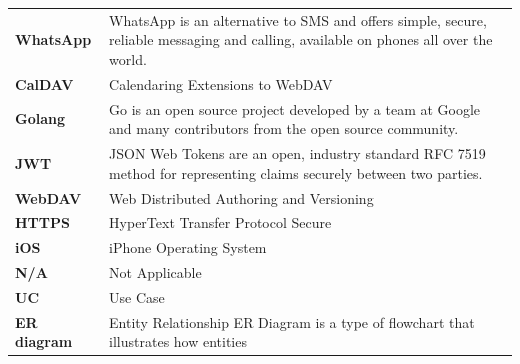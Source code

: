 \documentclass[12pt,a4paper]{report}
\begin{document}
\begin{singlespace}
\begin{center}
\begin{longtable}{p{}p{}}
            \textbf{WhatsApp}         & WhatsApp is an alternative to SMS and offers simple, secure, reliable messaging and calling, available on phones all over the world. \cite{whatsapp-about} \\[1ex]

            \textbf{CalDAV}           & Calendaring Extensions to WebDAV                                                                                                                           \\[1ex]

            \textbf{Golang}           & Go is an open source project developed by a team at Google and many contributors from the open source community. \cite{def:Golang}                         \\[1ex]

            \textbf{JWT}              & JSON Web Tokens are an open, industry standard RFC 7519 method for representing claims securely between two parties. \cite{def:JWT}                        \\[1ex]

            \textbf{WebDAV}           & Web Distributed Authoring and Versioning                                                                                                                   \\[1ex]

            \textbf{HTTPS}            & HyperText Transfer Protocol Secure                                                                                                                         \\[1ex]

            \textbf{iOS}              & iPhone Operating System                                                                                                                                    \\[1ex]

            \textbf{N/A}              & Not Applicable                                                                                                                                             \\[1ex]

            \textbf{UC}               & Use Case                                                                                                                                                   \\[1ex]

            \textbf{ER diagram}       & Entity Relationship ER Diagram is a type of flowchart that illustrates how entities                                                                        \\[1ex]


\end{longtable}
\end{center}
\end{singlespace}
\end{document}
